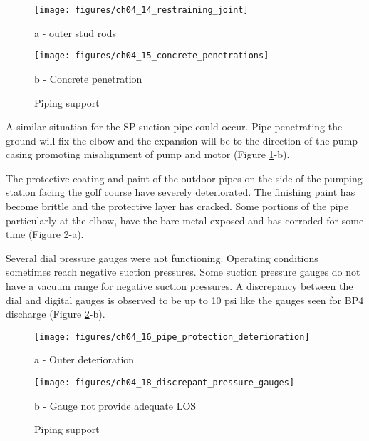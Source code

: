 \begin{figure}[!htb]
	\begin{minipage}[b]{0.5\linewidth}
		\centering
		\texttt{[image: figures/ch04\_14\_restraining\_joint]}
		\caption*{a - outer stud rods}
	\end{minipage}
	\hspace{0.05cm}
	\begin{minipage}[b]{0.5\linewidth}
		\centering
		\texttt{[image: figures/ch04\_15\_concrete\_penetrations]}
		\caption*{b - Concrete penetration}
	\end{minipage}
	\caption{Piping support}
	\label{ch04_piping03}
\end{figure}


A similar situation for the SP suction pipe could occur. Pipe penetrating the ground will fix the elbow and the expansion will be to the direction of the pump casing promoting misalignment of pump and motor (Figure \ref{ch04_piping03}-b). 

The protective coating and paint of the outdoor pipes on the side of the pumping station facing the golf course have severely deteriorated. The finishing paint has become brittle and the protective layer has cracked. Some portions of the pipe particularly at the elbow, have the bare metal exposed and has corroded for some time (Figure \ref{ch04_piping04}-a). 

Several dial pressure gauges were not functioning. Operating conditions sometimes reach negative suction pressures. Some suction pressure gauges do not have a vacuum range for negative suction pressures.  A discrepancy between the dial and digital gauges is observed to be up to 10 psi like the gauges seen for BP4 discharge (Figure \ref{ch04_piping04}-b). 

\begin{figure}[!htb]
	\begin{minipage}[b]{0.3\linewidth}
		\centering
		\texttt{[image: figures/ch04\_16\_pipe\_protection\_deterioration]}
		\caption*{a - Outer deterioration}
	\end{minipage}
	\hspace{0.05cm}
	\begin{minipage}[b]{0.7\linewidth}
		\centering
		\texttt{[image: figures/ch04\_18\_discrepant\_pressure\_gauges]}
		\caption*{b - Gauge not provide adequate LOS}
	\end{minipage}
	\caption{Piping support}
	\label{ch04_piping04}
\end{figure}

